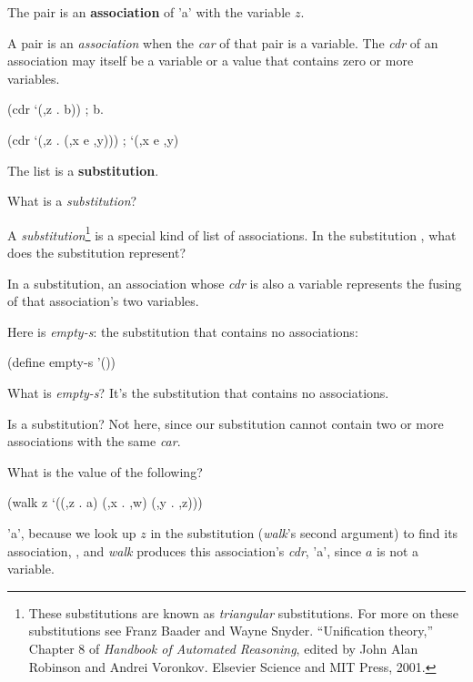 \documentclass[letterpaper]{article}
\begin{document}
The pair  is an \textbf{association} of \scheme'a' with the variable
$z$.

A pair is an \textit{association} when the \textit{car} of that pair is a variable.
The \textit{cdr} of an association may itself be a variable or a value that contains
zero or more variables.

\begin{schemedisplay}
  (cdr `(,z . b))
  ; b.

  (cdr `(,z . (,x e ,y)))
  ; `(,x e ,y)
\end{schemedisplay}

The list  is a \textbf{substitution}.

What is a \textit{substitution}?

A \textit{substitution}\footnote{
  These substitutions are known as \textit{triangular} substitutions. For more on these
  substitutions see Franz Baader and Wayne Snyder. ``Unification theory,'' Chapter 8
  of \textit{Handbook of Automated Reasoning}, edited by John Alan Robinson and Andrei
  Voronkov. Elsevier Science and MIT Press, 2001.
} is a special kind of list of associations. In the substitution ,
what does the substitution  represent?

In a substitution, an association whose \textit{cdr} is also a variable represents the
fusing of that association's two variables.

Here is \textit{empty-s}: the substitution that contains no associations:

\begin{schemedisplay}
  (define empty-s '())
\end{schemedisplay}

What is \textit{empty-s}? It's the substitution that contains no associations.

Is  a substitution? Not here, since our
substitution cannot contain two or more associations with the same \textit{car}.

What is the value of the following?

\begin{schemedisplay}
  (walk z
    `((,z . a) (,x . ,w) (,y . ,z)))
\end{schemedisplay}

\scheme'a', because we look up $z$ in the substitution (\textit{walk}'s second
argument) to find its association, , and \textit{walk} produces
this association's \textit{cdr}, \scheme'a', since $a$ is not a variable.
\end{document}
